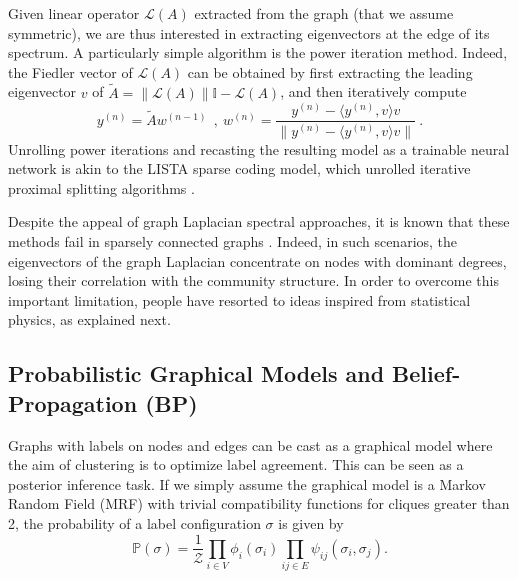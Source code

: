 \documentclass{article} \usepackage{iclr2019_conference,times}
\begin{document}
Given linear operator $\mathcal{L}(A)$ extracted from the graph (that we assume symmetric),
we are thus interested in extracting eigenvectors at the edge of its spectrum.
A particularly simple algorithm is the power iteration method. 
Indeed, the Fiedler vector of $\mathcal{L}(A)$ can be obtained by first extracting 
the leading eigenvector $v$ of $\tilde{A} = \|\mathcal{L}(A) \| \mathbb{I} - \mathcal{L}(A) $, and 
then iteratively compute
$$y^{(n)} = \tilde{A} w^{(n-1)}~~,~w^{(n)} = \frac{y^{(n)} - \langle y^{(n)}, v \rangle v}{\| y^{(n)} - \langle y^{(n)}, v \rangle v \| }~.$$
Unrolling power iterations and recasting the resulting model as a trainable neural network is akin to the LISTA sparse coding model, which unrolled iterative proximal splitting algorithms \citep{LISTA}. 

Despite the appeal of graph Laplacian spectral approaches, it is known
that these methods fail in sparsely connected graphs \citep{krzakala2013spectral} . Indeed, in such scenarios, the eigenvectors of the graph Laplacian concentrate on nodes with dominant degrees, losing their correlation with the community structure. In order to overcome this important limitation, people have resorted to ideas inspired from statistical physics, as explained next.



\subsection{Probabilistic Graphical Models and Belief-Propagation (BP)}
\label{bpsection}

Graphs with labels on nodes and edges can be cast as a graphical model where the aim of clustering is to optimize label agreement.  This can be seen as a posterior inference task. If we simply assume the graphical model is a Markov Random Field (MRF) with trivial compatibility functions for cliques greater than 2, the probability of a label configuration $\sigma$ is given by 
\begin{equation}
     \mathbb{P}(\sigma) = \frac{1}{\mathcal{Z}} \displaystyle \prod_{i \in V} \phi_i(\sigma_i) \displaystyle \prod_{ij \in E} \psi_{ij}(\sigma_i, \sigma_j).
\end{equation}
\end{document}

